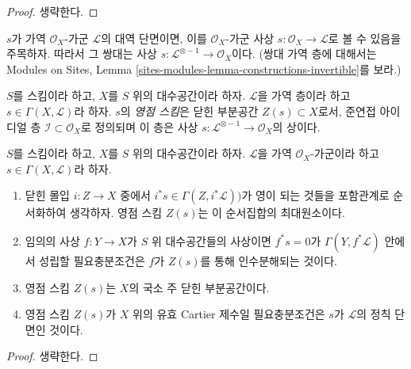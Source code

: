 \begin{proof}
생략한다.
\end{proof}

\noindent
$s$가 가역 $\mathcal{O}_X$-가군 $\mathcal{L}$의 대역 단면이면, 이를
$\mathcal{O}_X$-가군 사상 $s : \mathcal{O}_X \to \mathcal{L}$로 볼 수
있음을 주목하자. 따라서 그 쌍대는 사상
$s : \mathcal{L}^{\otimes -1} \to \mathcal{O}_X$이다.
(쌍대 가역 층에 대해서는 Modules on Sites, Lemma
\ref{sites-modules-lemma-constructions-invertible}를 보라.)

\begin{definition}
\label{definition-zero-scheme-s}
$S$를 스킴이라 하고, $X$를 $S$ 위의 대수공간이라 하자.
$\mathcal{L}$을 가역 층이라 하고 $s \in \Gamma(X, \mathcal{L})$라 하자.
$s$의 {\it 영점 스킴}은 닫힌 부분공간 $Z(s) \subset X$로서, 준연접
아이디얼 층 $\mathcal{I} \subset \mathcal{O}_X$로 정의되며 이 층은 사상
$s : \mathcal{L}^{\otimes -1} \to \mathcal{O}_X$의 상이다.
\end{definition}

\begin{lemma}
\label{lemma-zero-scheme}
$S$를 스킴이라 하고, $X$를 $S$ 위의 대수공간이라 하자.
$\mathcal{L}$을 가역 $\mathcal{O}_X$-가군이라 하고
$s \in \Gamma(X, \mathcal{L})$라 하자.
\begin{enumerate}
\item 닫힌 몰입 $i : Z \to X$ 중에서
$i^*s \in \Gamma(Z, i^*\mathcal{L}))$가 영이 되는 것들을 포함관계로
순서화하여 생각하자. 영점 스킴 $Z(s)$는
이 순서집합의 최대원소이다.
\item 임의의 사상 $f : Y \to X$가 $S$ 위 대수공간들의 사상이면
$f^*s = 0$가 $\Gamma(Y, f^*\mathcal{L})$ 안에서 성립할 필요충분조건은 $f$가
$Z(s)$를 통해 인수분해되는 것이다.
\item 영점 스킴 $Z(s)$는 $X$의 국소 주 닫힌 부분공간이다.
\item 영점 스킴 $Z(s)$가 $X$ 위의 유효 Cartier 제수일 필요충분조건은
$s$가 $\mathcal{L}$의 정칙 단면인 것이다.
\end{enumerate}
\end{lemma}

\begin{proof}
생략한다.
\end{proof}

